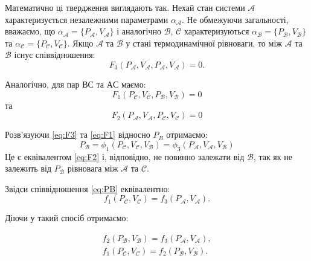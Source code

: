 Математично ці твердження виглядають так. Нехай стан системи $\mathcal{A}$
характеризується незалежними параметрами $\alpha_{\mathcal{A}}$.
Не обмежуючи загальності, вважаємо, що
$\alpha_{\mathcal{A}} = \{P_{\mathcal{A}}, V_{\mathcal{A}}\}$ і
аналогічно $\mathcal{B}$, $\mathcal{C}$ характеризуються $\alpha_{\mathcal{B}} = \{P_{\mathcal{B}}, V_{\mathcal{B}}\}$ та $\alpha_{\mathcal{C}} = \{P_{\mathcal{C}}, V_{\mathcal{C}}\}$. Якщо $\mathcal{A}$ та $\mathcal{B}$ у стані термодинамічної рівноваги, то між $\mathcal{A}$ та $\mathcal{B}$ існує співвідношення:
\begin{equation}\label{eq:F3}
    F_3 (P_{\mathcal{A}}, V_{\mathcal{A}}, P_{\mathcal{A}},V_{\mathcal{A}}) = 0.
\end{equation}

Аналогічно, для пар $ВС$ та $АС$ маємо:
\begin{equation}\label{eq:F1}
    F_1  (P_{\mathcal{C}}, V_{\mathcal{C}} ,P_{\mathcal{B}},V_{\mathcal{B}})=0
\end{equation}
та
\begin{equation}\label{eq:F2}
    F_2  (P_{\mathcal{A}},V_{\mathcal{A}}, P_{\mathcal{C}}, V_{\mathcal{C}} )=0
\end{equation}

Розв'язуючи \eqref{eq:F3} та \eqref{eq:F1} відносно $P_B$ отримаємо:
\begin{equation}\label{eq:PB}
    P_{\mathcal{B}} = \phi_1 (P_{\mathcal{C}}, V_{\mathcal{C}}, V_{\mathcal{B}})=\phi_3 (P_{\mathcal{A}}, V_{\mathcal{A}}, V_{\mathcal{B}})
\end{equation}
Це є еквівалентом \eqref{eq:F2} і, відповідно,  не повинно залежати від $\mathcal{B}$, так як не залежить від $P_{\mathcal{B}}$ рівновага між $\mathcal{A}$ та $\mathcal{C}$.

Звідси співвідношення \eqref{eq:PB} еквівалентно:
\begin{equation}\label{eq:f1}
    f_1 (P_{\mathcal{C}},V_{\mathcal{C}})=f_3 (P_{\mathcal{A}}, V_{\mathcal{A}}).
\end{equation}

Діючи у такий спосіб отримаємо:

\begin{align}
    f_2 (P_{\mathcal{B}}, V_{\mathcal{B}})=f_3 (P_{\mathcal{A}}, V_{\mathcal{A}}), \\
    f_1 (P_{\mathcal{C}}, V_{\mathcal{C}})=f_2 (P_{\mathcal{B}}, V_{\mathcal{B}}).
\end{align}

